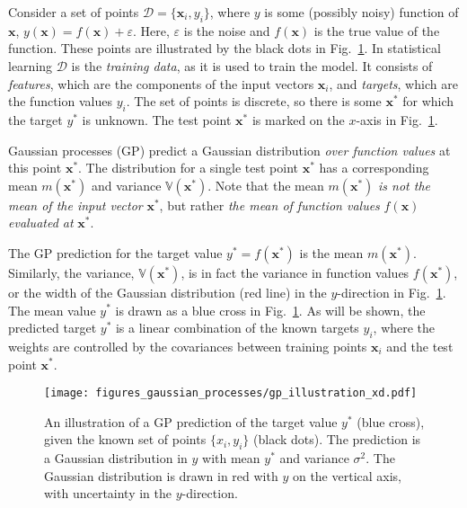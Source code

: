 \documentclass[twoside,english]{uiofysmaster}
\begin{document}
{{%

Consider a set of points $\mathcal{D} = \{\textbf{x}_i, y_i\}$, where $y$ is some (possibly noisy) function of $\textbf{x}$, $y(\textbf{x}) = f(\textbf{x}) + \varepsilon$. Here, $\varepsilon$ is the noise and $f(\textbf{x})$ is the true value of the function. These points are illustrated by the black dots in Fig.~\ref{Fig:: gaussian process : GP illustration}. In statistical learning $\mathcal{D}$ is the \textit{training data}, as it is used to train the model. It consists of \textit{features}, which are the components of the input vectors $\textbf{x}_i$, and \textit{targets}, which are the function values $y_i$. The set of points is discrete, so there is some $\textbf{x}^*$ for which the target $y^*$ is unknown. The test point $\textbf{x}^*$ is marked on the $x$-axis in Fig.~\ref{Fig:: gaussian process : GP illustration}.

Gaussian processes (GP) predict a Gaussian distribution \textit{over function values} at this point $\textbf{x}^*$. The distribution for a single test point $\textbf{x}^*$ has a corresponding mean $m(\textbf{x}^*)$ and variance $\mathbb{V}(\textbf{x}^*)$. Note that the mean $m(\textbf{x}^*)$ \textit{is not the mean of the input vector} $\textbf{x}^*$, but rather \textit{the mean of function values} $f(\textbf{x})$ \textit{evaluated at} $\textbf{x}^*$. 

The GP prediction for the target value $y^*=f(\textbf{x}^*)$ is the mean $m(\textbf{x}^*)$. Similarly, the variance, $\mathbb{V}(\textbf{x}^*)$, is in fact the variance in function values $f(\textbf{x}^*)$, or the width of the Gaussian distribution (red line) in the $y$-direction in Fig.~\ref{Fig:: gaussian process : GP illustration}. The mean value $y^*$ is drawn as a blue cross in Fig.~\ref{Fig:: gaussian process : GP illustration}. As will be shown, the predicted target $y^*$ is a linear combination of the known targets $y_i$, where the weights are controlled by the covariances between training points $\textbf{x}_i$ and the test point $\textbf{x}^*$.  


\begin{figure}
\centering
\texttt{[image: figures\_gaussian\_processes/gp\_illustration\_xd.pdf]}
\caption{An illustration of a GP prediction of the target value $y^*$ (blue cross), given the known set of points $\{x_i, y_i\}$ (black dots). The prediction is a Gaussian distribution in $y$ with mean $y^*$ and variance $\sigma^2$. The Gaussian distribution is drawn in red with $y$ on the vertical axis, with uncertainty in the $y$-direction.}
\label{Fig:: gaussian process : GP illustration}
\end{figure}

}}
\end{document}
